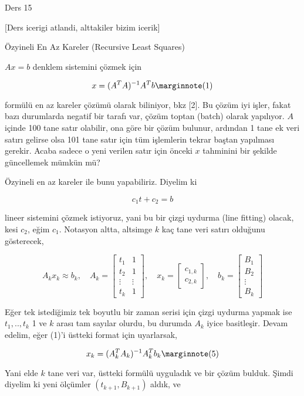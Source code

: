 \documentclass[12pt,fleqn]{article}\usepackage{../../common}
\begin{document}
Ders 15

[Ders icerigi atlandi, alttakiler bizim icerik]

Özyineli En Az Kareler (Recursive Least Squares)

$Ax = b$ denklem sistemini çözmek için 

$$ 
x = (A^TA)^{-1}A^Tb  
\mlabel{1} 
$$ 

formülü en az kareler çözümü olarak biliniyor, bkz [2]. Bu çözüm iyi işler,
fakat bazı durumlarda negatif bir tarafı var, çözüm toptan (batch) olarak
yapılıyor. $A$ içinde 100 tane satır olabilir, ona göre bir çözüm bulunur,
ardından 1 tane ek veri satırı gelirse olsa 101 tane satır için tüm
işlemlerin tekrar baştan yapılması gerekir. Acaba sadece o yeni verilen
satır için önceki $x$ tahminini bir şekilde güncellemek mümkün mü?

Özyineli en az kareler ile bunu yapabiliriz. Diyelim ki 

$$ c_1 t + c_2 = b $$

lineer sistemini çözmek istiyoruz, yani bu bir çizgi uydurma (line fitting)
olacak, kesi $c_2$, eğim $c_1$. Notasyon altta, altsimge $k$ kaç tane veri
satırı olduğunu gösterecek,

$$ A_kx_k \approx b_k, \quad 
A_k = \left[\begin{array}{cc}
t_1 & 1 \\
t_2 & 1 \\
\vdots & \vdots \\
t_k & 1 
\end{array}\right], \quad 
x_k = \left[\begin{array}{r}
c_{1,k} \\ c_{2,k}
\end{array}\right], \quad
b_k = \left[\begin{array}{r}
B_1 \\ B_2 \\ \vdots \\ B_k
\end{array}\right]
$$

Eğer tek istediğimiz tek boyutlu bir zaman serisi için çizgi uydurma yapmak
ise $t_1,..,t_k$ 1 ve $k$ arası tam sayılar olurdu, bu durumda $A_k$ iyice
basitleşir. Devam edelim, eğer (1)'i üstteki format için uyarlarsak,

$$ 
x_k = (A_k^TA_k)^{-1}A_k^T b_k 
\mlabel{5} 
$$

Yani elde $k$ tane veri var, üstteki formülü uyguladık ve bir çözüm
bulduk. Şimdi diyelim ki yeni ölçümler $(t_{k+1}, B_{k+1})$ aldık, ve 
\end{document}
